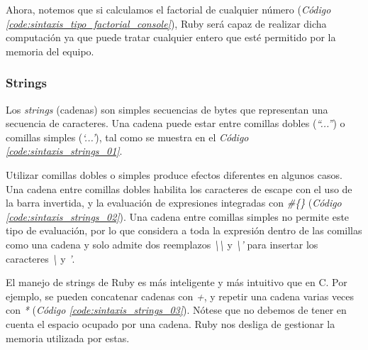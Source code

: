 \documentclass{article}
\newcommand{\refcode}[1]{\textit{Código \ref{#1}}}
\begin{document}
 
\bigskip

Ahora, notemos que si calculamos el factorial de cualquier número (\refcode{code:sintaxis_tipo_factorial_console}), Ruby será capaz de realizar dicha computación ya que puede tratar cualquier entero que esté permitido por la memoria del equipo.

 
\bigskip


\subsubsection{Strings}
	
	Los \textit{strings} (cadenas) son simples secuencias de bytes que representan una secuencia de caracteres. Una cadena puede estar entre comillas dobles (\textit{``...''}) o comillas simples (\textit{`...'}), tal como se muestra en el \refcode{code:sintaxis_strings_01}. 


\bigskip

	Utilizar comillas dobles o simples produce efectos diferentes en algunos casos. Una cadena entre comillas dobles habilita los caracteres de escape con el uso de la barra invertida, y la evaluación de expresiones integradas con \textit{\#\{\}} (\refcode{code:sintaxis_strings_02}). Una cadena entre comillas simples no permite este tipo de evaluación, por lo que considera a toda la expresión dentro de las comillas como una cadena y solo admite dos reemplazos \textit{\textbackslash\textbackslash} y \textit{\textbackslash'} para insertar los caracteres \textit{\textbackslash} y \textit{'}.

 
\bigskip

	El manejo de strings de Ruby es más inteligente y más intuitivo que en C. Por ejemplo, se pueden concatenar cadenas con \textit{+}, y repetir una cadena varias veces con \textit{*} (\refcode{code:sintaxis_strings_03}). Nótese que no debemos de tener en cuenta el espacio ocupado por una cadena. Ruby nos desliga de gestionar la memoria utilizada por estas.

 
\bigskip
\end{document}
